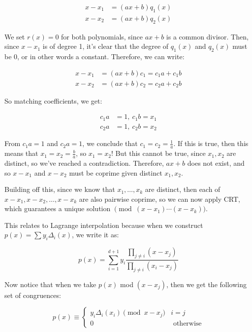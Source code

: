 \documentclass[11pt]{article}
\begin{document}
\begin{Parts}
\begin{solution}
    \begin{align*}
        x - x_1 &= (ax + b)q_1(x)\\
        x - x_2 &= (ax + b)q_2(x)
    \end{align*}

    We set $r(x) = 0$ for both polynomials, since $ax +b$ is a common divisor. Then, since $x - x_1$ is of degree 1, it's clear that the degree of $q_1(x)$ and $q_2(x)$ must be 0, or in other words a constant. Therefore, we can write:

    \begin{align*}
        x -x_1 &= (ax + b) c_1 = c_1a + c_1b\\
        x - x_2 &= (ax+b) c_2 = c_2a + c_2b
    \end{align*}

    So matching coefficients, we get:

    \begin{align*}
        c_1a &= 1, \ c_1b = x_1\\
        c_2a &= 1, \ c_2b = x_2
    \end{align*}

    From $c_1a = 1$ and $c_2a = 1$, we conclude that $c_1 = c_2 = \frac{1}{a}$. If this is true, then this means that $x_1 = x_2 = \frac{b}{a}$, so $x_1 = x_2$! But this cannot be true, since $x_1, x_2$ are distinct, so we've reached a contradiction. Therefore, $ax +b$ does not exist, and so $x - x_1$ and $x - x_2$ must be coprime given distinct $x_1, x_2$.

    Building off this, since we know that $x_1, \dots, x_k$ are distinct, then each of $x - x_1, x- x_2, \dots, x- x_k$ are also pairwise coprime, so we can now apply CRT, which guarantees a unique solution $\pmod{(x - x_1)\cdots(x - x_k)}$. 

    This relates to Lagrange interpolation because when we construct $p(x) = \sum y_i \Delta_i(x)$, we write it as:

    \[ p(x) = \sum_{i = 1}^{d +1} y_i \frac{\prod_{j \neq i}(x - x_j)}{\prod_{j \neq i}(x_i - x_j)}\]

    Now notice that when we take $p(x)$ mod $(x - x_j)$, then we get the following set of congruences:

    \[ 
        p(x) \equiv \begin{cases}
            y_i \Delta_i(x_i) \pmod{x - x_j} & i = j \\
            0 &\text{ otherwise}
        \end{cases}
    \] 


\end{solution}
\end{Parts}
\end{document}
